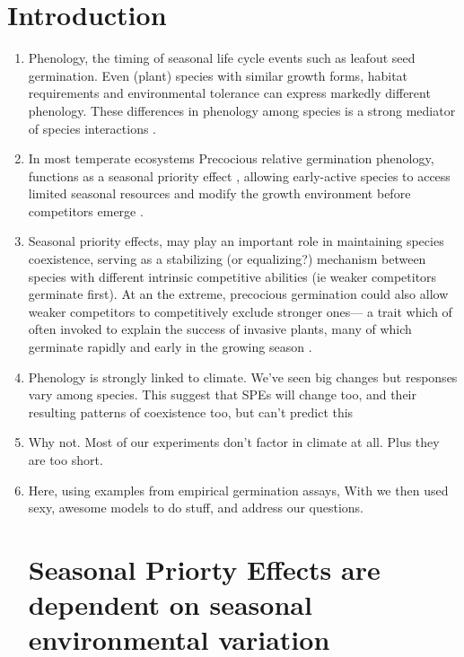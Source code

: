 \documentclass{article}[12pt]
\begin{document}


\section{Introduction}
\begin{enumerate}
\item Phenology, the timing of seasonal life cycle events such as leafout seed germination. Even (plant) species with similar growth forms, habitat requirements and environmental tolerance can express markedly different phenology. These differences in phenology among species is a strong mediator of species interactions \citep{}. 

\item In most temperate ecosystems Precocious relative germination phenology, functions as a seasonal priority effect  \citep{Wainwright_2011, Buonaiuto2021}, allowing early-active species to access limited seasonal resources and modify the growth environment before competitors emerge \citep{Kardol2013}. 

\item Seasonal priority effects, may play an important role in maintaining species coexistence, serving as a stabilizing (or equalizing?) mechanism between species with different intrinsic competitive abilities (ie weaker competitors germinate first). At an the extreme, precocious germination could also allow weaker competitors to competitively exclude stronger ones--- a trait which of often invoked to explain the success of invasive plants, many of which germinate rapidly and early in the growing season \citep{Gioria2018,Gioria:2017wo}.

\item Phenology is strongly linked to climate. We've seen big changes but responses vary among species. This suggest that SPEs will change too, and their resulting patterns of coexistence too, but can't predict this 

\item Why not. Most of our experiments don't factor in climate at all. Plus they are too short.

\item Here, using examples from empirical germination assays, With  we then used sexy, awesome models to do stuff, and address our questions.

\section*{Seasonal Priorty Effects are dependent on seasonal environmental variation}


\end{enumerate}
\end{document}
